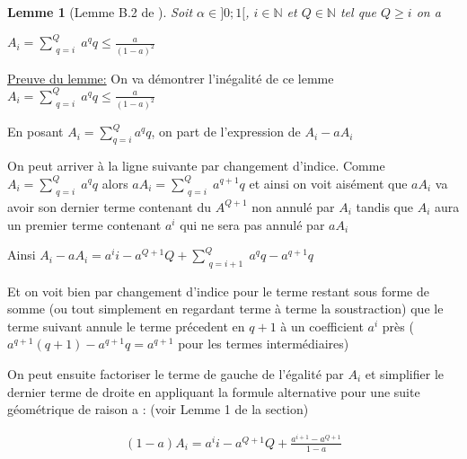 \documentclass{article}
\newtheorem{lemma}{Lemme}
\begin{document}
\bigskip

\begin{lemma}[Lemme B.2 de \cite{defossez2022a}]

\bigskip

Soit $\alpha \in ]0;1[$, $i \in \mathbb{N}$ et $Q\in \mathbb{N}$ tel que $Q\geq i$ on a

\bigskip

$A_i=\sum\limits_{\substack {q=i}}^{Q} a^q q \leq \frac{a}{(1-a)^2}$
\end{lemma}

\bigskip

\bigskip

\underline{Preuve du lemme:} On va démontrer l'inégalité de ce lemme $A_i=\sum\limits_{\substack {q=i}}^{Q} a^q q \leq \frac{a}{(1-a)^2}$

\bigskip

En posant $A_i=\sum_{q=i}^{Q} a^q q$, on part de l'expression de $A_i-a A_i$

\bigskip

On peut arriver à la ligne suivante par changement d'indice. Comme  $A_i=\sum\limits_{\substack {q=i}}^{Q} a^q q$ alors  $aA_i=\sum\limits_{\substack {q=i}}^{Q} a^{q+1} q$ et ainsi on voit aisément que $aA_i$ va avoir son dernier terme contenant du $A^{Q+1}$ non annulé par $A_i$ tandis que $A_i$ aura un premier terme contenant $a^i$ qui ne sera pas annulé par $aA_i$

\bigskip

Ainsi $A_i-a A_i= a^i i -a^{Q+1}Q + \sum\limits_{\substack {q=i+1}}^{Q} a^q q- a^{q+1} q$ 

\bigskip

Et on voit bien par changement d'indice pour le terme restant sous forme de somme (ou tout simplement en regardant terme à terme la soustraction) que le terme suivant annule le terme précedent en $q+1$ à un coefficient $a^i$ près ($a^{q+1} (q+1) - a^{q+1} q=a^{q+1}$ pour les termes intermédiaires)

\bigskip

On peut ensuite factoriser le terme de gauche de l'égalité par $A_i$ et simplifier le dernier terme de droite en appliquant la formule alternative pour une suite géométrique de raison a : (voir Lemme 1 de la section)

\begin{eqnarray*}
    (1-a)A_i = a^i i - a^{Q+1}Q +  \frac{a^{i+1} - a^{Q+1}}{1-a}
\end{eqnarray*}


\bigskip
\end{document}
